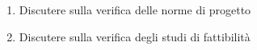 \begin{enumerate}
    \item Discutere sulla verifica delle norme di progetto
    \item Discutere sulla verifica degli studi di fattibilità
\end{enumerate}